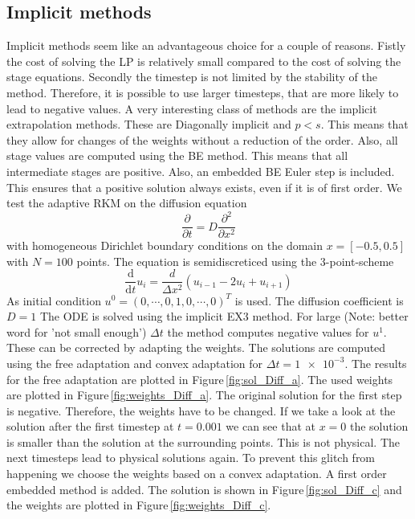 \documentclass[a4paper]{article}
\numberwithin{equation}{section}
\theoremstyle{plain}
\theoremstyle{definition}
\numberwithin{theorem}{section}
\newcommand{\dt}{{\Delta t}}
\newcommand{\1}{\mathbbm{1}}
\begin{document}
\subsection{Implicit methods}
Implicit methods seem like an advantageous choice for a couple of reasons. 
Fistly the cost of solving the LP is relatively small compared to the cost of solving the stage equations. 
Secondly the timestep is not limited by the stability of the method. 
Therefore, it is possible to use larger timesteps, that are more likely to lead to negative values. 
A very interesting class of methods are the implicit extrapolation methods. These are Diagonally implicit and $p < s$. This means that they allow for changes of the weights without a reduction of the order. 
Also, all stage values are computed using the BE method. This means that all intermediate stages are positive.  
Also, an embedded BE Euler step is included. This ensures that a positive solution always exists, even if it is of first order.  
We test the adaptive RKM on the diffusion equation 
\begin{equation}
\frac{\partial }{\partial t} = D \frac{\partial^2}{\partial x^2}
\end{equation}
with homogeneous Dirichlet boundary conditions on the domain $x = [-0.5,0.5]$ with $N=100$ points. The equation is semidiscreticed using the 3-point-scheme
\begin{equation}
\frac{\mathrm d}{\mathrm d t} u_i = \frac{d}{\Delta x^2} \left( u_{i-1} - 2u_i + u_{i+1} \right)
\end{equation}
As initial condition $u^0 = (0,\cdots,0,1,0,\cdots,0)^T$ is used. The diffusion coefficient is $D=1$ 
The ODE is solved using the implicit EX3 method.  
For large (Note: better word for 'not small enough') $\dt$ the method computes negative values for $u^1$. 
These can be corrected by adapting the weights.  
The solutions are computed using the free adaptation and convex adaptation for $\dt = \num{1e-3}$.
The results for the free adaptation are plotted in Figure\,\ref{fig:sol_Diff_a}. The used weights are plotted in Figure\,\ref{fig:weights_Diff_a}. 
The original solution for the first step is negative. Therefore, the weights have to be changed. 
If we take a look at the solution after the first timestep at $t=0.001$ we can see that at $x=0$ the solution is smaller than the solution at the surrounding points.  
This is not physical.  
The next timesteps lead to physical solutions again. 
To prevent this glitch from happening we choose the weights based on a convex adaptation. 
A first order embedded method is added. The solution is shown in Figure\,\ref{fig:sol_Diff_c} and the weights are plotted in Figure\,\ref{fig:weights_Diff_c}. 
\end{document}
